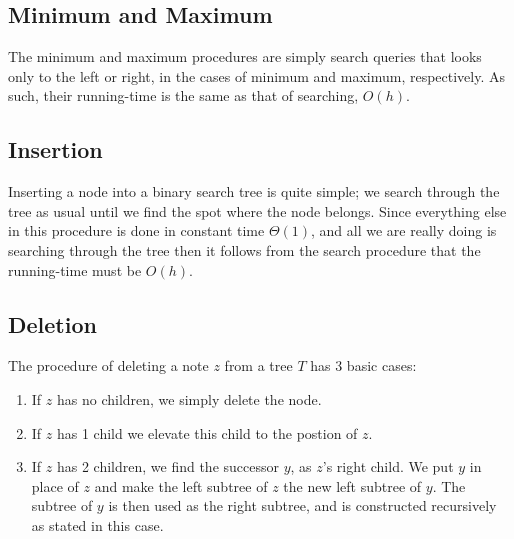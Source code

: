 \subsection{Minimum and Maximum}
The minimum and maximum procedures are simply search queries that looks only
to the left or right, in the cases of minimum and maximum, respectively. As
such, their running-time is the same as that of searching, $O(h)$.



\subsection{Insertion}
Inserting a node into a binary search tree is quite simple; we search through
the tree as usual until we find the spot where the node belongs. Since
everything else in this procedure is done in constant time $\Theta(1)$, and
all we are really doing is searching through the tree then it follows from the
search procedure that the running-time must be $O(h)$.

\subsection{Deletion}
The procedure of deleting a note $z$ from a tree $T$ has 3 basic cases:

\begin{enumerate}
\item{If $z$ has no children, we simply delete the node.}
\item{If $z$ has 1 child we elevate this child to the postion of $z$.}
\item{If $z$ has 2 children, we find the successor $y$, as $z$'s right child.
We put $y$ in place of $z$ and make the left subtree of $z$ the new left
subtree of $y$. The subtree of $y$ is then used as the right subtree, and is
constructed recursively as stated in this case.}
\end{enumerate}

